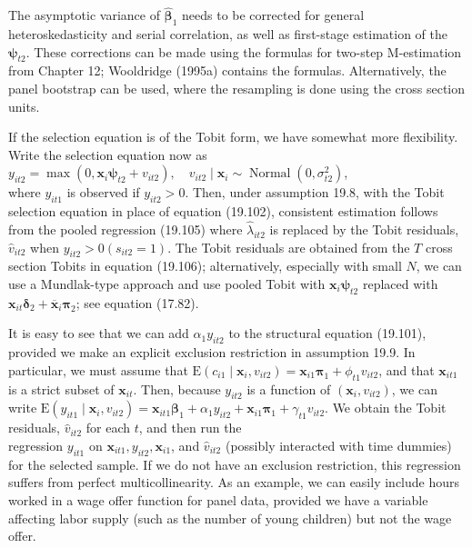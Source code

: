 \documentclass[10pt]{article}
\begin{document}
The asymptotic variance of $\hat{\boldsymbol{\beta}}_{1}$ needs to be corrected for general heteroskedasticity and serial correlation, as well as first-stage estimation of the $\boldsymbol{\psi}_{t 2}$. These corrections can be made using the formulas for two-step M-estimation from Chapter 12; Wooldridge (1995a) contains the formulas. Alternatively, the panel bootstrap can be used, where the resampling is done using the cross section units.

If the selection equation is of the Tobit form, we have somewhat more flexibility. Write the selection equation now as\\
$y_{i t 2}=\max \left(0, \mathbf{x}_{i} \boldsymbol{\psi}_{t 2}+v_{i t 2}\right), \quad v_{i t 2} \mid \mathbf{x}_{i} \sim \operatorname{Normal}\left(0, \sigma_{t 2}^{2}\right)$,\\
where $y_{i t 1}$ is observed if $y_{i t 2}>0$. Then, under assumption 19.8, with the Tobit selection equation in place of equation (19.102), consistent estimation follows from the pooled regression (19.105) where $\hat{\lambda}_{i t 2}$ is replaced by the Tobit residuals, $\hat{v}_{i t 2}$ when $y_{i t 2}>0\left(s_{i t 2}=1\right)$. The Tobit residuals are obtained from the $T$ cross section Tobits in equation (19.106); alternatively, especially with small $N$, we can use a Mundlak-type approach and use pooled Tobit with $\mathbf{x}_{i} \boldsymbol{\psi}_{t 2}$ replaced with $\mathbf{x}_{i t} \boldsymbol{\delta}_{2}+\overline{\mathbf{x}}_{i} \boldsymbol{\pi}_{2}$; see equation (17.82).

It is easy to see that we can add $\alpha_{1} y_{i t 2}$ to the structural equation (19.101), provided we make an explicit exclusion restriction in assumption 19.9. In particular, we must assume that $\mathrm{E}\left(c_{i 1} \mid \mathbf{x}_{i}, v_{i t 2}\right)=\mathbf{x}_{i 1} \boldsymbol{\pi}_{1}+\phi_{t 1} v_{i t 2}$, and that $\mathbf{x}_{i t 1}$ is a strict subset of $\mathbf{x}_{i t}$. Then, because $y_{i t 2}$ is a function of $\left(\mathbf{x}_{i}, v_{i t 2}\right)$, we can write $\mathrm{E}\left(y_{i t 1} \mid \mathbf{x}_{i}, v_{i t 2}\right)=\mathbf{x}_{i t 1} \boldsymbol{\beta}_{1}+ \alpha_{1} y_{i t 2}+\mathbf{x}_{i 1} \boldsymbol{\pi}_{1}+\gamma_{t 1} v_{i t 2}$. We obtain the Tobit residuals, $\hat{v}_{i t 2}$ for each $t$, and then run the\\
regression $y_{i t 1}$ on $\mathbf{x}_{i t 1}, y_{i t 2}, \mathbf{x}_{i 1}$, and $\hat{v}_{i t 2}$ (possibly interacted with time dummies) for the selected sample. If we do not have an exclusion restriction, this regression suffers from perfect multicollinearity. As an example, we can easily include hours worked in a wage offer function for panel data, provided we have a variable affecting labor supply (such as the number of young children) but not the wage offer.
\end{document}
